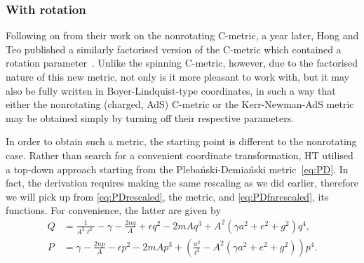 \documentclass[
twoside,
openright,
frontopenright,
]{dmathesis}
\newcommand{\nn}{\nonumber}
\newcommand{\PD}{Pleba\'nski-Demia\'nski}
\begin{document}
\subsubsection{With rotation}
Following on from their work on the nonrotating C-metric, a year later, Hong
and Teo published a similarly factorised version of the C-metric which contained
a rotation parameter~\cite{Hong:2004dm}. Unlike the spinning C-metric, however,
due to the factorised nature of this new metric, not only is it more pleasant to
work with, but it may also be fully written in Boyer-Lindquist-type coordinates,
in such a way that either the nonrotating (charged, AdS) C-metric or the
Kerr-Newman-AdS metric may be obtained simply by turning off their respective
parameters.

In order to obtain such a metric, the starting point is different to the
nonrotating case. Rather than search for a convenient coordinate
transformation, HT utilised a top-down approach starting from the \PD{}
metric~\eqref{eq:PD}. In fact, the derivation requires making the same rescaling
as we did earlier, therefore we will pick up from \cref{eq:PDrescaled}, the
metric, and \cref{eq:PDfnrescaled}, its functions. For convenience, the latter
are given by
\begin{align}
  Q &= \frac{1}{A^2\ell^2} - \gamma - \frac{2nq}{A} + \epsilon q^2 -
      2mAq^3 + A^2\left(\gamma a^2 + e^2 + g^2\right)q^4,\nn\\
  P &=  \gamma - \frac{2np}{A} - \epsilon p^2 -
      2mAp^3 + \left(\frac{a^2}{\ell^2} - A^2(\gamma a^2+e^2+g^2)\right)p^4.
\end{align}
\end{document}
